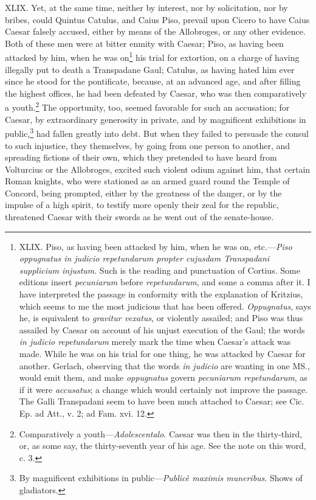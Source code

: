 XLIX. Yet, at the same time, neither by interest, nor by solicitation,
nor by bribes, could Quintus Catulus, and Caius Piso, prevail upon
Cicero to have Caius Caesar falsely accused, either by means of the
Allobroges, or any other evidence. Both of these men were at bitter
enmity with Caesar; Piso, as having been attacked by him, when he was
on\footnote{XLIX. Piso, as having been attacked by him, when he was on,
etc.—\emph{Piso oppugnatus in judicio repetundarum propter cujusdam
Transpadani supplicium injustum}. Such is the reading and punctuation
of Cortius. Some editions insert \emph{pecuniarum} before \emph{repetundarum},
and some a comma after it. I have interpreted the passage in
conformity with the explanation of Kritzius, which seems to me the
most judicious that has been offered. \emph{Oppugnatus}, says he, is
equivalent to \emph{gravitur vexatus}, or violently assailed; and Piso was
thus assailed by Caesar on account of his unjust execution of the
Gaul; the words \emph{in judicio repetundarum} merely mark the time when
Caesar's attack was made. While he was on his trial for one thing, he
was attacked by Caesar for another. Gerlach, observing that the words
\emph{in judicio} are wanting in one MS., would emit them, and make
\emph{oppugnatus} govern \emph{pecuniarum repetundarum}, as if it were
\emph{accusatus}; a change which would certainly not improve the passage.
The Galli Transpadani seem to have been much attached to Caesar; see
Cic. Ep. ad Att., v. 2; ad Fam. xvi. 12.} his trial for extortion, on a charge of having illegally put
to death a Transpadane Gaul; Catulus, as having hated him ever since
he stood for the pontificate, because, at an advanced age, and after
filling the highest offices, he had been defeated by Caesar, who was
then comparatively a youth.\footnote{Comparatively a youth—\emph{Adolescentalo}. Caesar was then in
the thirty-third, or, as some say, the thirty-seventh year of his age.
See the note on this word, c. 3.} The opportunity, too, seemed
favorable for such an accusation; for Caesar, by extraordinary
generosity in private, and by magnificent exhibitions in public,\footnote{By magnificent exhibitions in public—\emph{Publicè maximis muneribus}.
Shows of gladiators.}
had fallen greatly into debt. But when they failed to persuade the
consul to such injustice, they themselves, by going from one person to
another, and spreading fictions of their own, which they pretended to
have heard from Volturcius or the Allobroges, excited such violent
odium against him, that certain Roman knights, who were stationed as
an armed guard round the Temple of Concord, being prompted, either by
the greatness of the danger, or by the impulse of a high spirit, to
testify more openly their zeal for the republic, threatened Caesar
with their swords as he went out of the senate-house.

